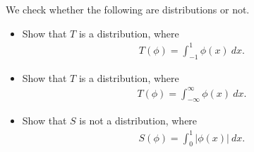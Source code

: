 \documentclass[11pt]{article}
\begin{document}
\begin{exercise}
    We check whether the following are distributions or not.
    \begin{itemize}    
        \item 
        Show that $T$ is a distribution, where 
        \begin{align}\label{eq:ex2 dist1}
            T(\phi) = \int_{-1}^{1} \phi(x) \ dx
            .
        \end{align}
        \item 
        Show that $T$ is a distribution, where 
        \begin{align}\label{eq:ex2 dist2}
            T(\phi) = \int_{-\infty}^{\infty} \phi(x) \ dx
            .
        \end{align}
        \item 
        Show that $S$ is not a distribution, where 
        \begin{align}\label{eq:ex2 dist3}
            S(\phi) = \int_{0}^{1} |\phi(x)| \ dx 
            .
        \end{align}
    \end{itemize}
\end{exercise}
\end{document}
